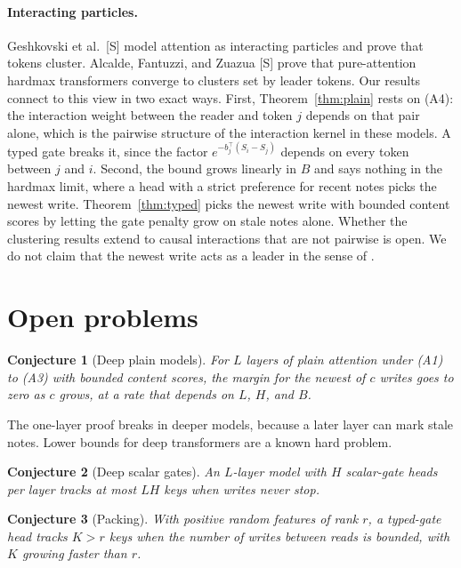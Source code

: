\documentclass[10pt]{article}
\newtheorem{conjecture}{Conjecture}
\theoremstyle{definition}
\theoremstyle{remark}
\begin{document}
\paragraph{Interacting particles.} Geshkovski et al.\ [S] \cite{glpr} model attention as interacting particles and prove that tokens cluster. Alcalde, Fantuzzi, and Zuazua [S] \cite{afz} prove that pure-attention hardmax transformers converge to clusters set by leader tokens. Our results connect to this view in two exact ways. First, Theorem~\ref{thm:plain} rests on (A4): the interaction weight between the reader and token $j$ depends on that pair alone, which is the pairwise structure of the interaction kernel in these models. A typed gate breaks it, since the factor $e^{-b_j^\top (S_i - S_j)}$ depends on every token between $j$ and $i$. Second, the bound grows linearly in $B$ and says nothing in the hardmax limit, where a head with a strict preference for recent notes picks the newest write. Theorem~\ref{thm:typed} picks the newest write with bounded content scores by letting the gate penalty grow on stale notes alone. Whether the clustering results extend to causal interactions that are not pairwise is open. We do not claim that the newest write acts as a leader in the sense of \cite{afz}.

\section{Open problems}\label{sec:open}

\begin{conjecture}[Deep plain models]
For $L$ layers of plain attention under (A1) to (A3) with bounded content scores, the margin for the newest of $c$ writes goes to zero as $c$ grows, at a rate that depends on $L$, $H$, and $B$.
\end{conjecture}
The one-layer proof breaks in deeper models, because a later layer can mark stale notes. Lower bounds for deep transformers are a known hard problem.

\begin{conjecture}[Deep scalar gates]
An $L$-layer model with $H$ scalar-gate heads per layer tracks at most $LH$ keys when writes never stop.
\end{conjecture}

\begin{conjecture}[Packing]\label{conj:pack}
With positive random features of rank $r$, a typed-gate head tracks $K > r$ keys when the number of writes between reads is bounded, with $K$ growing faster than $r$.
\end{conjecture}
\end{document}
